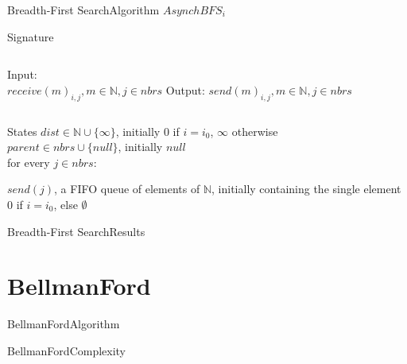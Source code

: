 \documentclass[pdf]{beamer}
\begin{document}
\begin{frame}{Breadth-First Search}{Algorithm}
	$AsynchBFS_i$
    \begin{block}{Signature}
        \begin{columns}
            Input:\\
            \hspace*{\parindent} $receive(m)_{i,j}, m \in \mathbb{N}, j \in nbrs$
            Output:
            \hspace*{\parindent} $send(m)_{i,j}, m \in \mathbb{N}, j \in nbrs$
        \end{columns}
    \end{block}
    \begin{block}{States}
        $dist \in \mathbb{N} \cup \{\infty\}$, initially $0$ if $i=i_0$, $\infty $ otherwise\\
        $parent \in nbrs \cup \{null\}$, initially $null$\\
        for every $j \in nbrs$:\\
        \hspace*{\parindent}
        \parbox{\textwidth}{$send(j)$,
        a FIFO queue of elements of $\mathbb{N}$,
        initially containing the single element $0$ if $i=i_0$, else $\emptyset$}
    \end{block}
	
\end{frame}

\begin{frame}{Breadth-First Search}{Results}
	
	
\end{frame}

\section{BellmanFord}
\begin{frame}{BellmanFord}{Algorithm}
	
	
\end{frame}
\begin{frame}{BellmanFord}{Complexity}
	
	
\end{frame}
\end{document}
